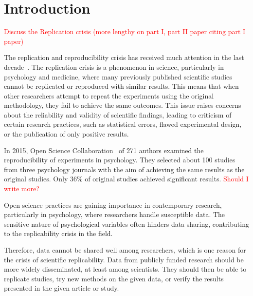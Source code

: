 \documentclass{article}
\begin{document}
\section{Introduction}

\textcolor{red}{Discuss the Replication crisis (more lengthy on part I, part II paper citing part I paper)}

The replication and reproducibility crisis has received much attention in the last decade~\cite{2012_Yong}.
The replication crisis is a phenomenon in science, particularly in psychology and medicine, where many previously published scientific studies cannot be replicated or reproduced with similar results. This means that when other researchers attempt to repeat the experiments using the original methodology, they fail to achieve the same outcomes. This issue raises concerns about the reliability and validity of scientific findings, leading to criticism of certain research practices, such as statistical errors, flawed experimental design, or the publication of only positive results.

In 2015, Open Science Collaboration~\cite{2015_OSC} of 271 authors examined the reproducibility of experiments in psychology. They selected about 100 studies from three psychology journals with the aim of achieving the same results as the original studies.  Only 36\% of original studies achieved significant results.
\textcolor{red}{Should I write more?}
\newline



Open science practices are gaining importance in contemporary research, particularly in psychology, where researchers handle susceptible data. The sensitive nature of psychological variables often hinders data sharing, contributing to the replicability crisis in the field.

Therefore, data cannot be shared well among researchers, which is one reason for the crisis of scientific replicability. Data from publicly funded research should be more widely disseminated, at least among scientists. They should then be able to replicate studies, try new methods on the given data, or verify the results presented in the given article or study.
\newline
\end{document}
